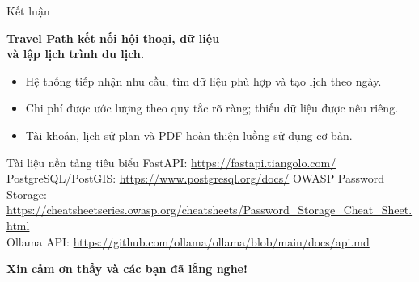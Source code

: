\documentclass[aspectratio=169,11pt]{beamer}
\begin{document}
\begin{frame}{Kết luận}
  \begin{center}
    {\LARGE\color{travelgreen}\bfseries Travel Path kết nối hội thoại, dữ liệu\\và lập lịch trình du lịch.}
  \end{center}
  \vspace{0.3cm}
  \begin{itemize}
    \item Hệ thống tiếp nhận nhu cầu, tìm dữ liệu phù hợp và tạo lịch theo ngày.
    \item Chi phí được ước lượng theo quy tắc rõ ràng; thiếu dữ liệu được nêu riêng.
    \item Tài khoản, lịch sử plan và PDF hoàn thiện luồng sử dụng cơ bản.
  \end{itemize}
  \vfill
  \begin{block}{Tài liệu nền tảng tiêu biểu}
    \scriptsize
    FastAPI: \url{https://fastapi.tiangolo.com/}\\
    PostgreSQL/PostGIS: \url{https://www.postgresql.org/docs/} \quad
    OWASP Password Storage: \url{https://cheatsheetseries.owasp.org/cheatsheets/Password_Storage_Cheat_Sheet.html}\\
    Ollama API: \url{https://github.com/ollama/ollama/blob/main/docs/api.md}
  \end{block}
  \begin{center}\color{travelgold}\Large\bfseries Xin cảm ơn thầy và các bạn đã lắng nghe!\end{center}
\end{frame}
\end{document}
